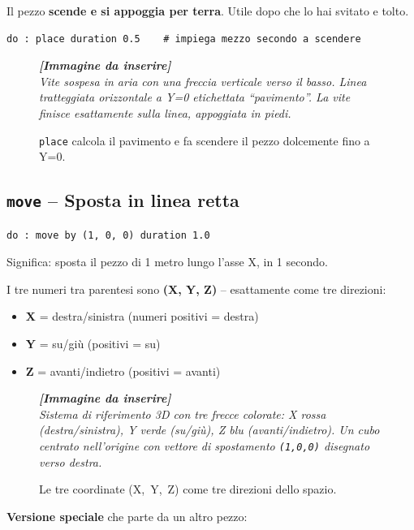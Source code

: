 ﻿\documentclass[a4paper,12pt,oneside]{book}
\newcommand{\val}[1]{\texttt{\color{cvtgreen}#1}}
\newcommand{\imgph}[2]{%
  \begin{tcolorbox}[colback=cvtlightblue!30,colframe=cvtblue!40,%
    width=#1,halign=center,valign=center,height=5cm,boxrule=0.5pt,arc=3pt]%
    \textcolor{cvtgray}{\itshape\footnotesize\textbf{[Immagine da inserire]}\\[3pt]#2}%
  \end{tcolorbox}}
\begin{document}
Il pezzo \textbf{scende e si appoggia per terra}. Utile dopo che lo hai svitato e tolto.

\begin{lstlisting}
do : place duration 0.5    # impiega mezzo secondo a scendere
\end{lstlisting}

\begin{figure}[H]
  \centering
  \imgph{9cm}{Vite sospesa in aria con una freccia verticale verso il basso. Linea tratteggiata orizzontale a Y=0 etichettata ``pavimento''. La vite finisce esattamente sulla linea, appoggiata in piedi.}
  \caption{\val{place} calcola il pavimento e fa scendere il pezzo dolcemente fino a Y=0.}
  \label{fig:place}
\end{figure}

\subsection{\texttt{move} -- Sposta in linea retta}

\begin{lstlisting}
do : move by (1, 0, 0) duration 1.0
\end{lstlisting}

Significa: sposta il pezzo di 1 metro lungo l'asse X, in 1 secondo.

I tre numeri tra parentesi sono \textbf{(X, Y, Z)} -- esattamente come tre direzioni:

\begin{itemize}
  \item \textbf{X} = destra/sinistra (numeri positivi = destra)
  \item \textbf{Y} = su/giù (positivi = su)
  \item \textbf{Z} = avanti/indietro (positivi = avanti)
\end{itemize}

\begin{figure}[H]
  \centering
  \imgph{10cm}{Sistema di riferimento 3D con tre frecce colorate: X rossa (destra/sinistra), Y verde (su/giù), Z blu (avanti/indietro). Un cubo centrato nell'origine con vettore di spostamento \texttt{(1,0,0)} disegnato verso destra.}
  \caption{Le tre coordinate (X,~Y,~Z) come tre direzioni dello spazio.}
  \label{fig:move-xyz}
\end{figure}

\textbf{Versione speciale} che parte da un altro pezzo:
\end{document}
